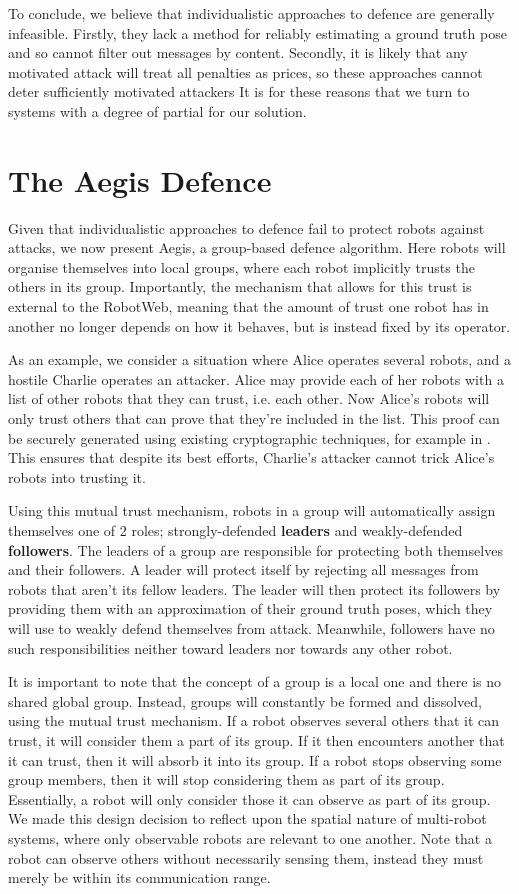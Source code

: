To conclude, we believe that individualistic approaches to defence are generally infeasible. Firstly, they lack a method for reliably estimating a ground truth pose and so cannot filter out messages by content. Secondly, it is likely that any motivated attack will treat all penalties as prices, so these approaches cannot deter sufficiently motivated attackers It is for these reasons that we turn to systems with a degree of partial for our solution.

\section{The Aegis Defence} \label{section:aegis}
Given that individualistic approaches to defence fail to protect robots against attacks, we now present Aegis, a group-based defence algorithm. Here robots will organise themselves into local groups, where each robot implicitly trusts the others in its group. Importantly, the mechanism that allows for this trust is external to the RobotWeb, meaning that the amount of trust one robot has in another no longer depends on how it behaves, but is instead fixed by its operator. 

As an example, we consider a situation where Alice operates several robots, and a hostile Charlie operates an attacker. Alice may provide each of her robots with a list of other robots that they can trust, i.e. each other. Now Alice's robots will only trust others that can prove that they're included in the list. This proof can be securely generated using existing cryptographic techniques, for example in \cite{zkp}. This ensures that despite its best efforts, Charlie's attacker cannot trick Alice's robots into trusting it.

Using this mutual trust mechanism, robots in a group will automatically assign themselves one of 2 roles; strongly-defended \textbf{leaders} and weakly-defended \textbf{followers}. The leaders of a group are responsible for protecting both themselves and their followers. A leader will protect itself by rejecting all messages from robots that aren't its fellow leaders. The leader will then protect its followers by providing them with an approximation of their ground truth poses, which they will use to weakly defend themselves from attack. Meanwhile, followers have no such responsibilities neither toward leaders nor towards any other robot.

It is important to note that the concept of a group is a local one and there is no shared global group. Instead, groups will constantly be formed and dissolved, using the mutual trust mechanism. If a robot observes several others that it can trust, it will consider them a part of its group. If it then encounters another that it can trust, then it will absorb it into its group. If a robot stops observing some group members, then it will stop considering them as part of its group. Essentially, a robot will only consider those it can observe as part of its group. We made this design decision to reflect upon the spatial nature of multi-robot systems, where only observable robots are relevant to one another. Note that a robot can observe others without necessarily sensing them, instead they must merely be within its communication range. 

